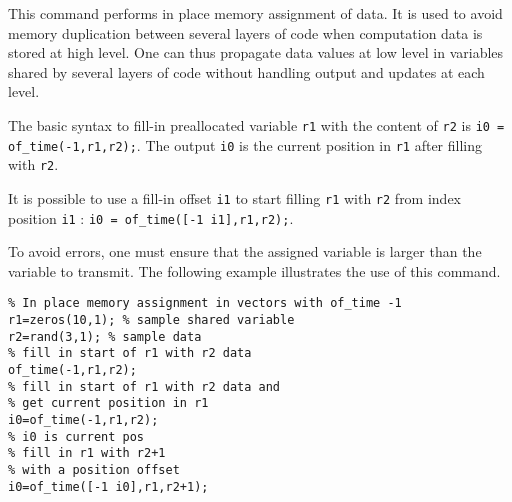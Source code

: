 
This command performs in place memory assignment of data. It is used to avoid memory duplication between several layers of code when computation data is stored at high level. One can thus propagate data values at low level in variables shared by several layers of code without handling output and updates at each level.

The basic syntax to fill-in preallocated variable {\tt r1} with the content of {\tt r2} is {\tt i0 = of\_time(-1,r1,r2);}. The output {\tt i0} is the current position in {\tt r1} after filling with {\tt r2}.

It is possible to use a fill-in offset {\tt i1} to start filling {\tt r1} with {\tt r2} from index position {\tt i1} : {\tt i0 = of\_time([-1 i1],r1,r2);}.

To avoid errors, one must ensure that the assigned variable is larger than the variable to transmit. The following example illustrates the use of this command.

\begin{verbatim}
% In place memory assignment in vectors with of_time -1
r1=zeros(10,1); % sample shared variable
r2=rand(3,1); % sample data
% fill in start of r1 with r2 data
of_time(-1,r1,r2); 
% fill in start of r1 with r2 data and 
% get current position in r1
i0=of_time(-1,r1,r2);
% i0 is current pos
% fill in r1 with r2+1
% with a position offset
i0=of_time([-1 i0],r1,r2+1);
\end{verbatim}%



\noindent \fetime



